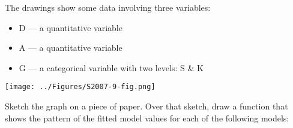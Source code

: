 
The drawings show some data involving three variables: 
\begin{itemize}
\item D --- a quantitative variable
\item A --- a quantitative variable
\item G --- a categorical variable with two levels: S \& K
\end{itemize}

\centerline{\texttt{[image: ../Figures/S2007-9-fig.png]}}

Sketch the graph on a piece of paper.  Over that sketch, draw a function
that shows the pattern of
the fitted model values for each of the following models:

